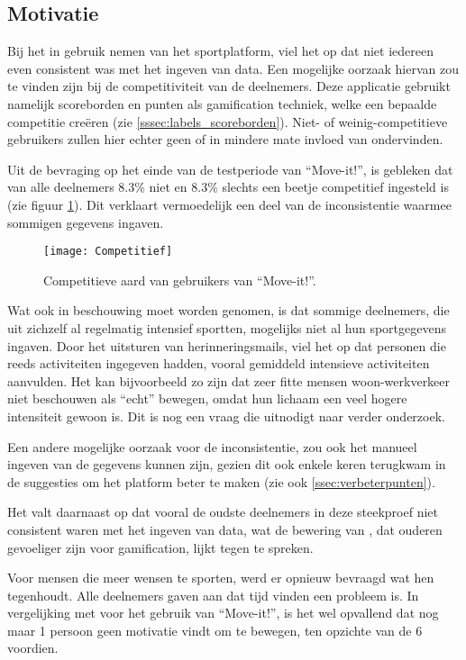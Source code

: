 \subsection{Motivatie}

Bij het in gebruik nemen van het sportplatform, viel het op dat niet iedereen even consistent was met het ingeven van data. Een mogelijke oorzaak hiervan zou te vinden zijn bij de competitiviteit van de deelnemers. Deze applicatie gebruikt namelijk scoreborden en punten als gamification techniek, welke een bepaalde competitie creëren (zie \ref{sssec:labels_scoreborden}). Niet- of weinig-competitieve gebruikers zullen hier echter geen of in mindere mate invloed van ondervinden.

Uit de bevraging op het einde van de testperiode van ``Move-it!'', is gebleken dat van alle deelnemers 8.3\% niet en 8.3\% slechts een beetje competitief ingesteld is (zie figuur \ref{fig:competitief}). Dit verklaart vermoedelijk een deel van de inconsistentie waarmee sommigen gegevens ingaven.

\begin{figure}[h]
    \caption[Competitieve aard van gebruikers van ``Move-it!'']{Competitieve aard van gebruikers van ``Move-it!''.}
    \texttt{[image: Competitief]}
    \label{fig:competitief}
\end{figure}

Wat ook in beschouwing moet worden genomen, is dat sommige deelnemers, die uit zichzelf al regelmatig intensief sportten, mogelijks niet al hun sportgegevens ingaven. Door het uitsturen van herinneringsmails, viel het op dat personen die reeds activiteiten ingegeven hadden, vooral gemiddeld intensieve activiteiten aanvulden. Het kan bijvoorbeeld zo zijn dat zeer fitte mensen woon-werkverkeer niet beschouwen als ``echt'' bewegen, omdat hun lichaam een veel hogere intensiteit gewoon is. Dit is nog een vraag die uitnodigt naar verder onderzoek.

Een andere mogelijke oorzaak voor de inconsistentie, zou ook het manueel ingeven van de gegevens kunnen zijn, gezien dit ook enkele keren terugkwam in de suggesties om het platform beter te maken (zie ook \ref{ssec:verbeterpunten}).

Het valt daarnaast op dat vooral de oudste deelnemers in deze steekproef niet consistent waren met het ingeven van data, wat de bewering van \textcite{PoloPena2020}, dat ouderen gevoeliger zijn voor gamification, lijkt tegen te spreken.

Voor mensen die meer wensen te sporten, werd er opnieuw bevraagd wat hen tegenhoudt. Alle deelnemers gaven aan dat tijd vinden een probleem is. In vergelijking met voor het gebruik van ``Move-it!'', is het wel opvallend dat nog maar 1 persoon geen motivatie vindt om te bewegen, ten opzichte van de 6 voordien.

